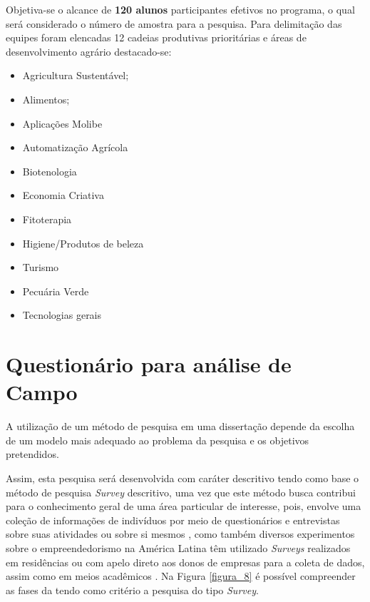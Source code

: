 Objetiva-se o alcance de \textbf{120 alunos} participantes efetivos no programa, o qual será considerado o número de amostra para a pesquisa. Para delimitação das equipes foram elencadas 12 cadeias produtivas  prioritárias e áreas de desenvolvimento agrário destacado-se:

\begin{multicols}{2}
\centering
    \begin{itemize}
    \item{Agricultura Sustentável;}
    \item{Alimentos;}
    \item{Aplicações Molibe}
    \item{Automatização Agrícola}
    \item{Biotenologia}
    \item{Economia Criativa}
    \item{Fitoterapia}
    \item{Higiene/Produtos de beleza}
    \item{Turismo}
    \item{Pecuária Verde}
    \item{Tecnologias gerais}
\end{itemize}
\end{multicols}

\section{Questionário para análise de Campo}

A utilização de um método de pesquisa em uma dissertação depende da escolha de um modelo mais adequado ao problema da pesquisa e os objetivos pretendidos.

Assim, esta pesquisa será desenvolvida com caráter descritivo tendo como base o método de pesquisa \textit{Survey} descritivo, uma vez que este método busca contribui para o conhecimento geral de uma área particular de interesse, pois, envolve uma coleção de informações de indivíduos por meio de questionários e entrevistas sobre suas atividades ou sobre si mesmos \cite{forza_survey_2002}, como também diversos experimentos sobre o empreendedorismo na América Latina têm utilizado \textit{Surveys} realizados em residências ou com apelo direto aos donos de empresas para a coleta de dados, assim como em meios acadêmicos \cite{lima_ser_2015}. Na Figura \ref{figura_8} é possível compreender as fases da tendo como critério a pesquisa do tipo \textit{Survey}.

